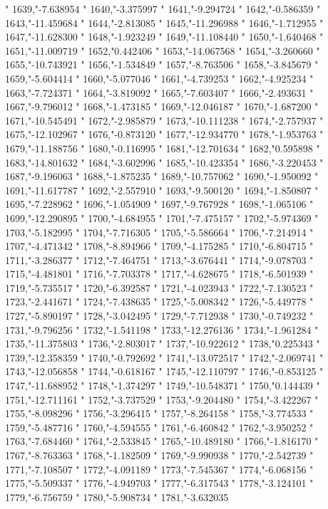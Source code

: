 "
1639,"-7.638954
"
1640,"-3.375997
"
1641,"-9.294724
"
1642,"-0.586359
"
1643,"-11.459684
"
1644,"-2.813085
"
1645,"-11.296988
"
1646,"-1.712955
"
1647,"-11.628300
"
1648,"-1.923249
"
1649,"-11.108440
"
1650,"-1.640468
"
1651,"-11.009719
"
1652,"0.442406
"
1653,"-14.067568
"
1654,"-3.260660
"
1655,"-10.743921
"
1656,"-1.534849
"
1657,"-8.763506
"
1658,"-3.845679
"
1659,"-5.604414
"
1660,"-5.077046
"
1661,"-4.739253
"
1662,"-4.925234
"
1663,"-7.724371
"
1664,"-3.819092
"
1665,"-7.603407
"
1666,"-2.493631
"
1667,"-9.796012
"
1668,"-1.473185
"
1669,"-12.046187
"
1670,"-1.687200
"
1671,"-10.545491
"
1672,"-2.985879
"
1673,"-10.111238
"
1674,"-2.757937
"
1675,"-12.102967
"
1676,"-0.873120
"
1677,"-12.934770
"
1678,"-1.953763
"
1679,"-11.188756
"
1680,"-0.116995
"
1681,"-12.701634
"
1682,"0.595898
"
1683,"-14.801632
"
1684,"-3.602996
"
1685,"-10.423354
"
1686,"-3.220453
"
1687,"-9.196063
"
1688,"-1.875235
"
1689,"-10.757062
"
1690,"-1.950092
"
1691,"-11.617787
"
1692,"-2.557910
"
1693,"-9.500120
"
1694,"-1.850807
"
1695,"-7.228962
"
1696,"-1.054909
"
1697,"-9.767928
"
1698,"-1.065106
"
1699,"-12.290895
"
1700,"-4.684955
"
1701,"-7.475157
"
1702,"-5.974369
"
1703,"-5.182995
"
1704,"-7.716305
"
1705,"-5.586664
"
1706,"-7.214914
"
1707,"-4.471342
"
1708,"-8.894966
"
1709,"-4.175285
"
1710,"-6.804715
"
1711,"-3.286377
"
1712,"-7.464751
"
1713,"-3.676441
"
1714,"-9.078703
"
1715,"-4.481801
"
1716,"-7.703378
"
1717,"-4.628675
"
1718,"-6.501939
"
1719,"-5.735517
"
1720,"-6.392587
"
1721,"-4.023943
"
1722,"-7.130523
"
1723,"-2.441671
"
1724,"-7.438635
"
1725,"-5.008342
"
1726,"-5.449778
"
1727,"-5.890197
"
1728,"-3.042495
"
1729,"-7.712938
"
1730,"-0.749232
"
1731,"-9.796256
"
1732,"-1.541198
"
1733,"-12.276136
"
1734,"-1.961284
"
1735,"-11.375803
"
1736,"-2.803017
"
1737,"-10.922612
"
1738,"0.225343
"
1739,"-12.358359
"
1740,"-0.792692
"
1741,"-13.072517
"
1742,"-2.069741
"
1743,"-12.056858
"
1744,"-0.618167
"
1745,"-12.110797
"
1746,"-0.853125
"
1747,"-11.688952
"
1748,"-1.374297
"
1749,"-10.548371
"
1750,"0.144439
"
1751,"-12.711161
"
1752,"-3.737529
"
1753,"-9.204480
"
1754,"-3.422267
"
1755,"-8.098296
"
1756,"-3.296415
"
1757,"-8.264158
"
1758,"-3.774533
"
1759,"-5.487716
"
1760,"-4.594555
"
1761,"-6.460842
"
1762,"-3.950252
"
1763,"-7.684460
"
1764,"-2.533845
"
1765,"-10.489180
"
1766,"-1.816170
"
1767,"-8.763363
"
1768,"-1.182509
"
1769,"-9.990938
"
1770,"-2.542739
"
1771,"-7.108507
"
1772,"-4.091189
"
1773,"-7.545367
"
1774,"-6.068156
"
1775,"-5.509337
"
1776,"-4.949703
"
1777,"-6.317543
"
1778,"-3.124101
"
1779,"-6.756759
"
1780,"-5.908734
"
1781,"-3.632035
